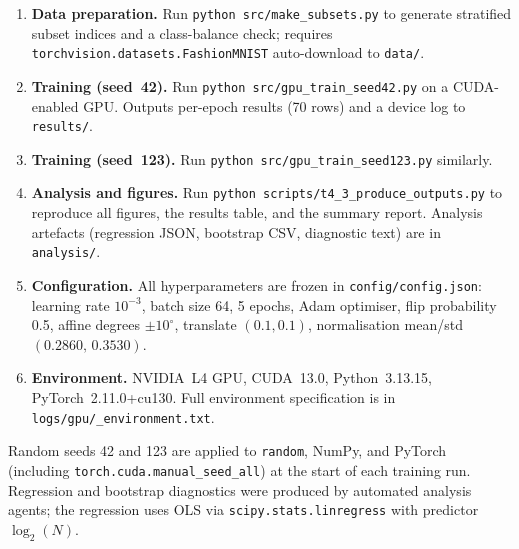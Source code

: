 \documentclass[11pt]{article}
\begin{document}
\begin{enumerate}[leftmargin=*, label=\arabic*.]
\item \textbf{Data preparation.}
  Run \texttt{python src/make\_subsets.py} to generate stratified subset indices
  and a class-balance check; requires
  \texttt{torchvision.datasets.FashionMNIST} auto-download to \texttt{data/}.
\item \textbf{Training (seed~42).}
  Run \texttt{python src/gpu\_train\_seed42.py} on a CUDA-enabled GPU.
  Outputs per-epoch results (70 rows) and a device log to \texttt{results/}.
\item \textbf{Training (seed~123).}
  Run \texttt{python src/gpu\_train\_seed123.py} similarly.
\item \textbf{Analysis and figures.}
  Run \texttt{python scripts/t4\_3\_produce\_outputs.py} to reproduce all
  figures, the results table, and the summary report.
  Analysis artefacts (regression JSON, bootstrap CSV, diagnostic text) are in
  \texttt{analysis/}.
\item \textbf{Configuration.}
  All hyperparameters are frozen in \texttt{config/config.json}:
  learning rate $10^{-3}$, batch size 64, 5 epochs, Adam optimiser,
  flip probability 0.5, affine degrees $\pm10^\circ$,
  translate $(0.1, 0.1)$,
  normalisation mean/std $(0.2860,\, 0.3530)$.
\item \textbf{Environment.}
  NVIDIA~L4 GPU, CUDA~13.0, Python~3.13.15, PyTorch~2.11.0+cu130.
  Full environment specification is in \texttt{logs/gpu/\_environment.txt}.
\end{enumerate}

Random seeds 42 and 123 are applied to \texttt{random}, NumPy, and PyTorch
(including \texttt{torch.cuda.manual\_seed\_all}) at the start of each
training run.
Regression and bootstrap diagnostics were produced by automated analysis agents;
the regression uses OLS via \texttt{scipy.stats.linregress} with
predictor $\log_2(N)$.



\end{document}

